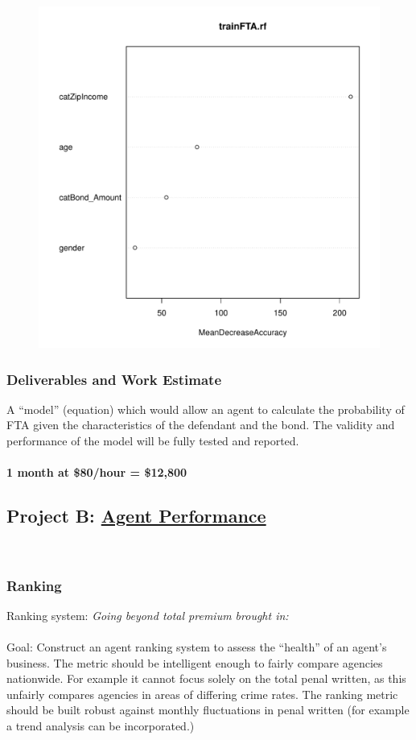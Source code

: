 \documentclass{article}
\begin{document}
\begin{figure}[H]
\centering
\includegraphics[width=0.40\paperwidth,page=3]{varPlot.pdf}
\end{figure}
 
\subsubsection{Deliverables and Work Estimate}
A ``model'' (equation) which would allow an agent to calculate the probability of FTA given the characteristics of the defendant and the bond.
The validity and performance of the model will be fully tested and reported. 
~\\
~\\
\textbf{1 month at \$80/hour = \$12,800}

\clearpage
\subsection{Project B: \underline{Agent Performance}}
~\\
\subsubsection{Ranking}
Ranking system: \textit{Going beyond total premium brought in:} \\
~\\
Goal: Construct an agent ranking system to assess the ``health'' of an 
agent's business. The metric should be intelligent enough to fairly compare agencies nationwide. 
For example it cannot focus solely on the total penal written, as this unfairly compares 
agencies in areas of differing crime rates. The ranking metric should be built robust 
against monthly fluctuations in penal written (for example a trend analysis can be incorporated.)
\end{document}
